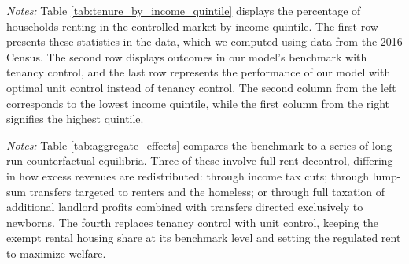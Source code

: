 \documentclass[parskip=full]{article}
\newenvironment{fignote2}[1]
{
\par
\medskip
\begin{minipage}{#1}
\footnotesize
}
{
\end{minipage}
}
\begin{document}
\begin{table}[H]
    \centering
    \caption{Households in controlled market by income quintile (all households)}
    \vspace{-0.5cm}
    \label{tab:tenure_by_income_quintile}     
    \vspace{-0.45cm}
    \begin{fignote2}{0.81\textwidth}
    \textit{Notes:} Table \ref{tab:tenure_by_income_quintile} displays the percentage of households renting in the controlled market by income quintile. The first row presents these statistics in the data, which we computed using data from the 2016 Census. The second row displays outcomes in our model's benchmark with tenancy control, and the last row represents the performance of our model with optimal unit control instead of tenancy control. The second column from the left corresponds to the lowest income quintile, while the first column from the right signifies the highest quintile.  
    \end{fignote2}
\end{table}

\begin{table}[H]
    \centering
    \caption{Aggregate effects generated by changes in rent-control policy}
    \vspace{-0.5cm}
    \label{tab:aggregate_effects}
    
    \vspace{-0.45cm}
    \begin{fignote2}{1.00\textwidth}
    \textit{Notes:} Table \ref{tab:aggregate_effects} compares the benchmark to a series of long-run counterfactual equilibria. Three of these involve full rent decontrol, differing in how excess revenues are redistributed: through income tax cuts; through lump-sum transfers targeted to renters and the homeless; or through full taxation of additional landlord profits combined with transfers directed exclusively to newborns. The fourth replaces tenancy control with unit control, keeping the exempt rental housing share at its benchmark level and setting the regulated rent to maximize welfare.
    \end{fignote2}
\end{table}
\end{document}
